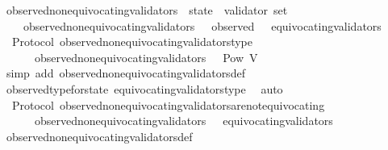 \begin{isabellebody}
\isanewline
\isanewline
{}\isamarkupfalse%
\ observed{\isacharunderscore}non{\isacharunderscore}equivocating{\isacharunderscore}validators\ {\isacharcolon}{\isacharcolon}\ {\isachardoublequoteopen}state\ {\isasymRightarrow}\ validator\ set{\isachardoublequoteclose}\isanewline
\ \ \isanewline
\ \ \ \ {\isachardoublequoteopen}observed{\isacharunderscore}non{\isacharunderscore}equivocating{\isacharunderscore}validators\ {\isasymsigma}\ {\isacharequal}\ observed\ {\isasymsigma}\ {\isacharminus}\ equivocating{\isacharunderscore}validators\ {\isasymsigma}{\isachardoublequoteclose}\isanewline
\isanewline
{}\isamarkupfalse%
\ {\isacharparenleft}\ Protocol{\isacharparenright}\ observed{\isacharunderscore}non{\isacharunderscore}equivocating{\isacharunderscore}validators{\isacharunderscore}type\ {\isacharcolon}\isanewline
\ \ {\isachardoublequoteopen}{\isasymforall}\ {\isasymsigma}\ {\isasymin}\ {\isasymSigma}{\isachardot}\ observed{\isacharunderscore}non{\isacharunderscore}equivocating{\isacharunderscore}validators\ {\isasymsigma}\ {\isasymin}\ Pow\ V{\isachardoublequoteclose}\isanewline
%
\isadelimproof
\ \ %
\endisadelimproof
%
\isatagproof
{}\isamarkupfalse%
\ {\isacharparenleft}simp\ add{\isacharcolon}\ observed{\isacharunderscore}non{\isacharunderscore}equivocating{\isacharunderscore}validators{\isacharunderscore}def{\isacharparenright}\isanewline
\ \ \isamarkupfalse%
\ observed{\isacharunderscore}type{\isacharunderscore}for{\isacharunderscore}state\ equivocating{\isacharunderscore}validators{\isacharunderscore}type\ \isamarkupfalse%
\ auto%
\endisatagproof
{\isafoldproof}%
%
\isadelimproof
\isanewline
%
\endisadelimproof
\isanewline
{}\isamarkupfalse%
\ {\isacharparenleft}\ Protocol{\isacharparenright}\ observed{\isacharunderscore}non{\isacharunderscore}equivocating{\isacharunderscore}validators{\isacharunderscore}are{\isacharunderscore}not{\isacharunderscore}equivocating\ {\isacharcolon}\isanewline
\ \ {\isachardoublequoteopen}{\isasymforall}\ {\isasymsigma}\ {\isasymin}\ {\isasymSigma}{\isachardot}\ observed{\isacharunderscore}non{\isacharunderscore}equivocating{\isacharunderscore}validators\ {\isasymsigma}\ {\isasyminter}\ equivocating{\isacharunderscore}validators\ {\isasymsigma}\ {\isacharequal}\ {\isasymemptyset}{\isachardoublequoteclose}\isanewline
%
\isadelimproof
\ \ %
\endisadelimproof
%
\isatagproof
{}\isamarkupfalse%
\ observed{\isacharunderscore}non{\isacharunderscore}equivocating{\isacharunderscore}validators{\isacharunderscore}def\isanewline

\end{isabellebody}
